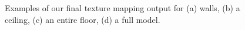\documentclass[10pt,twocolumn,letterpaper]{article}
\begin{document}
\begin{figure}
  \centering

  \centering {}

  \centering

  \centering {}
  \caption{Examples of our final texture mapping output for (a) walls,
    (b) a ceiling, (c) an entire floor, (d) a full model.}
  \label{fig:results}
\end{figure}

{\small   }
\end{document}
